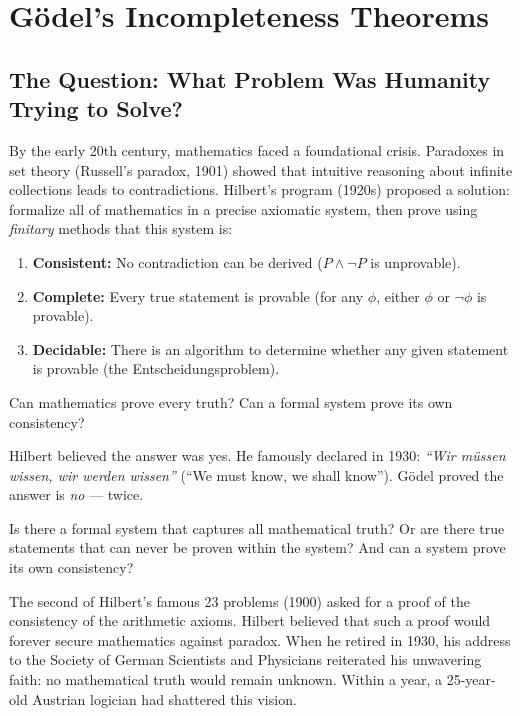 
\chapter{Gödel's Incompleteness Theorems}
\label{ch:godel}

\section{The Question: What Problem Was Humanity Trying to Solve?}
\label{sec:godel:question}

By the early 20th century, mathematics faced a foundational crisis. Paradoxes in set theory (Russell's paradox, 1901) showed that intuitive reasoning about infinite collections leads to contradictions. Hilbert's program (1920s) proposed a solution: formalize all of mathematics in a precise axiomatic system, then prove using \emph{finitary} methods that this system is:

\begin{enumerate}
\item \textbf{Consistent:} No contradiction can be derived ($P \land \neg P$ is unprovable).
\item \textbf{Complete:} Every true statement is provable (for any $\phi$, either $\phi$ or $\neg\phi$ is provable).
\item \textbf{Decidable:} There is an algorithm to determine whether any given statement is provable (the Entscheidungsproblem).
\end{enumerate}

Can mathematics prove every truth? Can a formal system prove its own consistency?

Hilbert believed the answer was yes. He famously declared in 1930: \emph{``Wir müssen wissen, wir werden wissen''} (``We must know, we shall know''). Gödel proved the answer is \emph{no} --- twice.

Is there a formal system that captures all mathematical truth? Or are there true statements that can never be proven within the system? And can a system prove its own consistency?

The second of Hilbert's famous 23 problems (1900) asked for a proof of the consistency of the arithmetic axioms. Hilbert believed that such a proof would forever secure mathematics against paradox. When he retired in 1930, his address to the Society of German Scientists and Physicians reiterated his unwavering faith: no mathematical truth would remain unknown. Within a year, a 25-year-old Austrian logician had shattered this vision.

